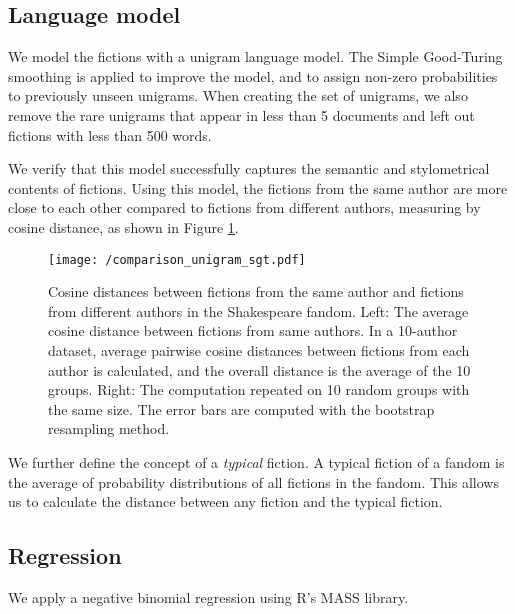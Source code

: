 \documentclass[a4paper]{article}
\begin{document}
\subsection{Language model}
We model the fictions with a unigram language model. The Simple Good-Turing smoothing\cite{gales1995good} is applied to improve the model, and to assign non-zero probabilities to previously unseen unigrams. When creating the set of unigrams, we also remove the rare unigrams that appear in less than 5 documents and left out fictions with less than 500 words.

We verify that this model successfully captures the semantic and stylometrical contents of fictions. Using this model, the fictions from the same author are more close to each other compared to fictions from different authors, measuring by cosine distance, as shown in Figure \ref{fig:comparison_unigram_sgt}.

\begin{figure}[htbp]
\begin{center}
\texttt{[image: /comparison\_unigram\_sgt.pdf]}
\caption{Cosine distances between fictions from the same author and fictions from different authors in the Shakespeare fandom.
Left: The average cosine distance between fictions from same authors. In a 10-author dataset, average pairwise cosine distances between fictions from each author is calculated, and the overall distance is the average of the 10 groups. Right: The computation repeated on 10 random groups with the same size. The error bars are computed with the bootstrap resampling method. }
\label{fig:comparison_unigram_sgt}
\end{center}
\end{figure}

We further define the concept of a \emph{typical} fiction. A typical fiction of a fandom is the average of probability distributions of all fictions in the fandom. This allows us to calculate the distance between any fiction and the typical fiction. 

\subsection{Regression}
We apply a negative binomial regression using R's MASS library. 











    
\end{document}
